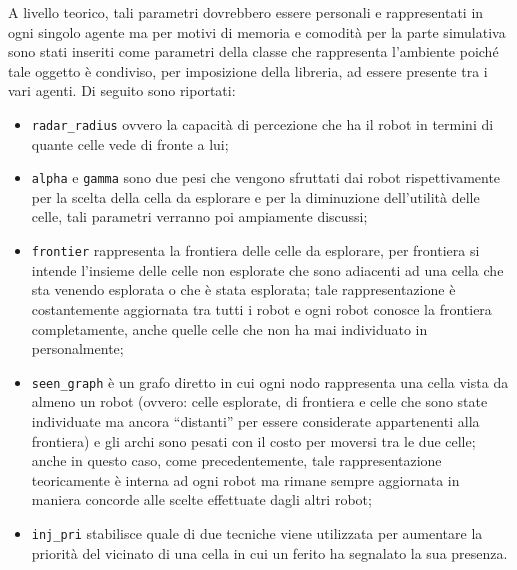 A livello teorico, tali parametri dovrebbero essere personali e rappresentati in ogni singolo agente ma per motivi di memoria e comodità per la parte simulativa sono stati inseriti come parametri della classe che rappresenta l'ambiente poiché tale oggetto è condiviso, per imposizione della libreria, ad essere presente tra i vari agenti.
Di seguito sono riportati:
\begin{itemize}
	\item \texttt{radar\_radius} ovvero la capacità di percezione che ha il robot in termini di quante celle vede di fronte a lui;
	\item \texttt{alpha} e \texttt{gamma} sono due pesi che vengono sfruttati dai robot rispettivamente per la scelta della cella da esplorare e per la diminuzione dell'utilità delle celle, tali parametri verranno poi ampiamente discussi;
	\item \texttt{frontier} rappresenta la frontiera delle celle da esplorare, per frontiera si intende l'insieme delle celle non esplorate che sono adiacenti ad una cella che sta venendo esplorata o che è stata esplorata; tale rappresentazione è costantemente aggiornata tra tutti i robot e ogni robot conosce la frontiera completamente, anche quelle celle che non ha mai individuato in personalmente;
	\item \texttt{seen\_graph} è un grafo diretto in cui ogni nodo rappresenta una cella vista da almeno un robot (ovvero: celle esplorate, di frontiera e celle che sono state individuate ma ancora “distanti” per essere considerate appartenenti alla frontiera) e gli archi sono pesati con il costo per moversi tra le due celle; anche in questo caso, come precedentemente, tale rappresentazione teoricamente è interna ad ogni robot ma rimane sempre aggiornata in maniera concorde alle scelte effettuate dagli altri robot;
	\item \texttt{inj\_pri} stabilisce quale di due tecniche viene utilizzata per aumentare la priorità del vicinato di una cella in cui un ferito ha segnalato la sua presenza.
\end{itemize}